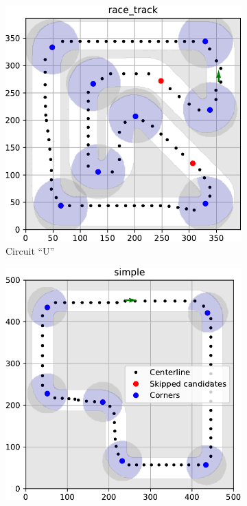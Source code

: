 \begin{figure}%
	\centering
	\begin{subfigure}[b]{0.49\textwidth}
		\centering
		\includegraphics[width=\textwidth]{../img/track-analysis/race_track}
		\caption{Circuit ``U''}
	\end{subfigure}
	\hfill
	\begin{subfigure}[b]{0.49\textwidth}%
	\centering
	\includegraphics[width=\textwidth]{../img/track-analysis/simple}

\end{subfigure}
\end{figure}

